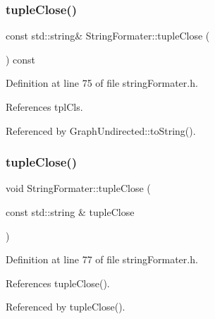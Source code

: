\subsubsection{\texorpdfstring{tuple\+Close()}{tupleClose()}\hspace{0.1cm}{\footnotesize\ttfamily [1/2]}}
{\footnotesize\ttfamily const std\+::string\& String\+Formater\+::tuple\+Close (\begin{DoxyParamCaption}{ }\end{DoxyParamCaption}) const\hspace{0.3cm}{\ttfamily [inline]}}



Definition at line 75 of file string\+Formater.\+h.



References tpl\+Cls.



Referenced by Graph\+Undirected\+::to\+String().

\mbox{\label{classStringFormater_ad0760f314079f6af19d09f45a0b77642}} 
\subsubsection{\texorpdfstring{tuple\+Close()}{tupleClose()}\hspace{0.1cm}{\footnotesize\ttfamily [2/2]}}
{\footnotesize\ttfamily void String\+Formater\+::tuple\+Close (\begin{DoxyParamCaption}\item[{const std\+::string \&}]{tuple\+Close }\end{DoxyParamCaption})\hspace{0.3cm}{\ttfamily [inline]}}



Definition at line 77 of file string\+Formater.\+h.



References tuple\+Close().



Referenced by tuple\+Close().

